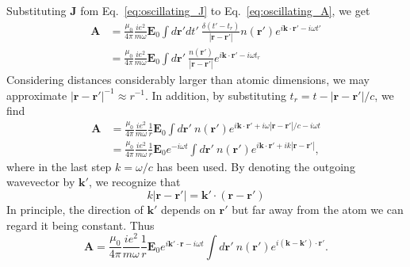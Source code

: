 Substituting $\mathbf{J}$ fom Eq.~\eqref{eq:oscillating_J} to Eq.~\eqref{eq:oscillating_A}, we get
\begin{align}
\mathbf{A} &= \frac{\mu_0}{4 \pi} \frac{ie^2}{m\omega} \mathbf{E}_0 \int d\mathbf{r}' dt' \  \frac{\delta(t'-t_r)}{|\mathbf{r}-\mathbf{r}'|} n(\mathbf{r}') e^{i \mathbf{k}\cdot\mathbf{r}'-i \omega t'} \nonumber \\ &= \frac{\mu_0}{4 \pi} \frac{ie^2}{m\omega} \mathbf{E}_0 \int d\mathbf{r}' \  \frac{n(\mathbf{r}')}{|\mathbf{r}-\mathbf{r}'|}  e^{i \mathbf{k}\cdot\mathbf{r}'-i \omega t_r}
\end{align}
Considering distances considerably larger than atomic dimensions, we may approximate $|\mathbf{r}-\mathbf{r}'|^{-1} \approx r^{-1}$. In addition, by substituting $t_r = t - |\mathbf{r}-\mathbf{r}'|/c$, we find
\begin{align}
\mathbf{A} &= \frac{\mu_0}{4 \pi} \frac{ie^2}{m\omega}\frac{1}{r} \mathbf{E}_0  \int d\mathbf{r}' \  n(\mathbf{r}')  e^{i \mathbf{k}\cdot\mathbf{r}'+i \omega |\mathbf{r}-\mathbf{r}'|/c -i \omega t} \nonumber \\ &= \frac{\mu_0}{4 \pi} \frac{ie^2}{m\omega}\frac{1}{r} \mathbf{E}_0  e^{-i \omega t} \int d\mathbf{r}' \  n(\mathbf{r}')  e^{i \mathbf{k}\cdot\mathbf{r}'+i k |\mathbf{r}-\mathbf{r}'|},
\end{align}
where in the last step $k=\omega/c$ has been used. By denoting the outgoing wavevector by $\mathbf{k}'$, we recognize that
\begin{equation}
k|\mathbf{r}-\mathbf{r}'| = \mathbf{k}'\cdot(\mathbf{r}-\mathbf{r}') 
\end{equation}
In principle, the direction of $\mathbf{k}'$ depends on $\mathbf{r}'$ but far away from the atom we can regard it being constant. Thus
\begin{equation}
\mathbf{A} = \frac{\mu_0}{4 \pi} \frac{ie^2}{m\omega}\frac{1}{r} \mathbf{E}_0  e^{i \mathbf{k}'\cdot\mathbf{r}-i \omega t} \int d\mathbf{r}' \  n(\mathbf{r}')  e^{i (\mathbf{k}-\mathbf{k}')\cdot\mathbf{r}'}.
\end{equation}

